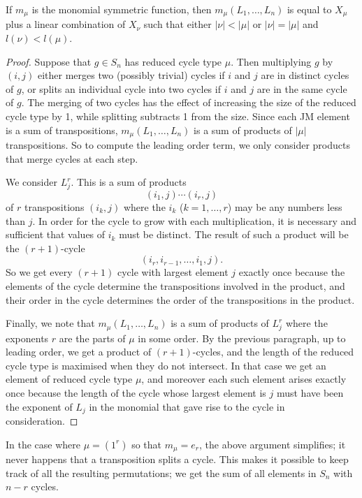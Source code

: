 \begin{proposition} \label{murphy_prop}
If $m_\mu$ is the monomial symmetric function, then $m_\mu(L_1, \ldots, L_n)$ is equal to $X_\mu$ plus a linear combination of $X_\nu$ such that either $|\nu| < |\mu|$ or $|\nu| = |\mu|$ and $l(\nu) < l(\mu)$.
\end{proposition}
\begin{proof}
Suppose that $g \in S_n$ has reduced cycle type $\mu$. Then multiplying $g$ by $(i,j)$ either merges two (possibly trivial) cycles if $i$ and $j$ are in distinct cycles of $g$, or splits an individual cycle into two cycles if $i$ and $j$ are in the same cycle of $g$. The merging of two cycles has the effect of increasing the size of the reduced cycle type by 1, while splitting subtracts 1 from the size. Since each JM element is a sum of transpositions, $m_\mu(L_1, \ldots, L_n)$ is a sum of products of $|\mu|$ transpositions. So to compute the leading order term, we only consider products that merge cycles at each step.

We consider $L_j^r$. This is a sum of products
\[
(i_1, j)\cdots (i_r,j)
\]
of $r$ transpositions $(i_k,j)$ where the $i_k$ ($k=1,\ldots,r$) may be any numbers less than $j$. In order for the cycle to grow with each multiplication, it is necessary and sufficient that values of $i_k$ must be distinct. The result of such a product will be the $(r+1)$-cycle
\[
(i_r, i_{r-1}, \ldots, i_1, j).
\]
So we get every $(r+1)$ cycle with largest element $j$ exactly once because the elements of the cycle determine the transpositions involved in the product, and their order in the cycle determines the order of the transpositions in the product.

Finally, we note that $m_\mu(L_1, \ldots, L_n)$ is a sum of products of $L_j^r$ where the exponents $r$ are the parts of $\mu$ in some order. By the previous paragraph, up to leading order, we get a product of $(r+1)$-cycles, and the length of the reduced cycle type is maximised when they do not intersect. In that case we get an element of reduced cycle type $\mu$, and moreover each such element arises exactly once because the length of the cycle whose largest element is $j$ must have been the exponent of $L_j$ in the monomial that gave rise to the cycle in consideration.
\end{proof}

In the case where $\mu = (1^r)$ so that $m_\mu = e_r$, the above argument simplifies; it never happens that a transposition splits a cycle. This makes it possible to keep track of all the resulting permutations; we get the sum of all elements in $S_n$ with $n-r$ cycles.

